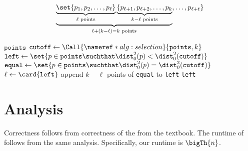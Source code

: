 \documentclass[draft]{article}
\begin{document}
\[\underbrace{\underbrace{\set{p_1, p_2, \dots, p_{\ell}}}_{\ell\text{ points}}\underbrace{\{p_{\ell{+1}}, p_{\ell+2},\dots,p_k}_{k-\ell\text{ points}}}_{\ell+(k-\ell)=k\text{ points}},\dots, p_{\ell+t}\}\]
\begin{algorithm}[H]
    \caption{}
    \label{alg:kclosest}
    \begin{algorithmic}[1]
        \State \Return $\texttt{points}$
        \Else
        \State $\texttt{cutoff}\gets\Call{\nameref*{alg:selection}}{\texttt{points}, k}$
        \State $\texttt{left} \gets \set{p\in \texttt{points} \suchthat \dist_0^2(p) < \dist_0^2(\texttt{cutoff})}$
        \State $\texttt{equal} \gets \set{p\in \texttt{points} \suchthat \dist_0^2(p) = \dist_0^2(\texttt{cutoff})}$
        \State $\ell\gets\card{\texttt{left}}$
        \State append $k - \ell$ points of \texttt{equal} to \texttt{left}
        \State \Return \texttt{left}
        \EndIf
        \EndFunction
    \end{algorithmic}
\end{algorithm}

\section{Analysis}
Correctness follows from correctness of the  from the textbook. The runtime of  follows from the same analysis. Specifically, our runtime is $\bigTh{n}$.
\end{document}
